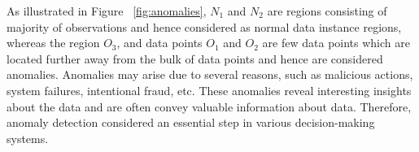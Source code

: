 As illustrated in Figure ~\ref{fig:anomalies}, $N_{1}$ and $N_{2}$ are regions consisting of majority of observations and hence considered as normal data instance regions, whereas the region $O_{3}$, and data points  $O_{1}$ and $O_{2}$  are few data points which are located further away from the bulk of data points and hence are considered anomalies. Anomalies may arise due to several reasons, such as malicious actions, system failures, intentional fraud, etc. These anomalies reveal interesting insights about the data and are often convey valuable information about data. Therefore, anomaly detection considered an essential step in various decision-making systems.

